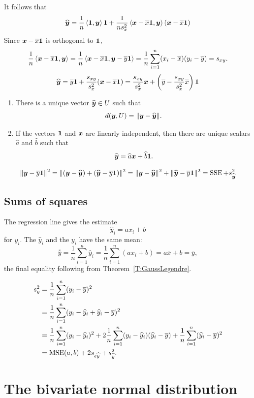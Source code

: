 \documentclass[12pt]{amsart}
\begin{document}
It follows that
\[
    \widehat{\boldsymbol{y}} = \frac1n\left\langle \mathbf{1}, \boldsymbol{y}\right\rangle\mathbf{1} + 
    \frac1{n s_x^2}\left\langle\boldsymbol{x} - \overline x\mathbf{1},\boldsymbol{y}\right\rangle (\boldsymbol{x} - \overline x\mathbf{1})
\]
Since $\boldsymbol{x}-\overline x\mathbf{1}$ is orthogonal to $\mathbf{1}$,
\[
    \frac1n\left\langle\boldsymbol{x} - \overline x\mathbf{1},\boldsymbol{y}\right\rangle = \frac1n\left\langle\boldsymbol{x} - \overline x\mathbf{1},\boldsymbol{y} - \overline y\mathbf{1}\right\rangle = \frac1n\sum_{i=1}^n(x_i-\overline x)(y_i-\overline y) = s_{xy}.
\]
\[
    \widehat {\boldsymbol{y}} = \overline y\mathbf{1} + \frac{s_{xy}}{s_x^2}(\boldsymbol{x}-\overline x\mathbf{1}) = \frac{s_{xy}}{s_x^2}\boldsymbol{x} + \left(\overline y - \frac{s_{xy}}{s_x^2}\overline x\right)\mathbf{1}
\]
\begin{theorem}\hfill
    \begin{enumerate}
        \item There is a unique vector $\widehat{\boldsymbol{y}}\in U$ such that 
    \[d(\boldsymbol{y}, U) = \|\boldsymbol{y}-\widehat{\boldsymbol{y}}\|.\]
    \item If the vectors $\mathbf{1}$ and $\boldsymbol{x}$ are linearly independent,
    then there are unique scalars $\hat a$ and $\hat b$ such that
    \[\widehat{\boldsymbol{y}} = \widehat a\boldsymbol{x} + \widehat b\mathbf{1}.\]
\end{enumerate}
\end{theorem}

\[
    \| \boldsymbol{y} - \overline y\mathbf{1}\|^2 = \| (\boldsymbol{y} - \widehat{\boldsymbol{y}})  + (\widehat{\boldsymbol{y}} - \overline y\mathbf{1})\|^2 = \|\boldsymbol{y} - \widehat {\boldsymbol{y}}\|^2 + \|\widehat {\boldsymbol{y}} - \overline y\mathbf{1}\|^2 = \operatorname{SSE} + s_{\widehat {\boldsymbol{y}}}^2
\]

\subsection{Sums of squares}
The regression line gives the estimate
\[
    \hat{y}_i = ax_i + b
\]
for $y_i$. The $\hat{y}_i$ and the $y_i$ have the same mean:
\[
    \overline{\hat y} = \frac1n\sum_{i=1}^n \hat{y}_i =\frac1n\sum_{i=1}^n(ax_i + b) =  a\bar{x} + b = \bar{y},
\]
the final equality following from Theorem~\ref{T:GaussLegendre}.

\begin{align*}
s_y^2 &= \frac1n\sum_{i=1}^n (y_i - \overline y)^2\\
&= \frac1n\sum_{i=1}^n (y_i - \widehat{y}_i + \widehat{y}_i - \overline y)^2\\
&= \frac1n\sum_{i=1}^n (y_i - \widehat{y}_i)^2 
+ 2\frac1n\sum_{i=1}^n (y_i - \widehat{y}_i)(\widehat{y}_i - \overline y)
+ \frac1n\sum_{i=1}^n(\widehat{y}_i - \overline y)^2\\
&= \operatorname{MSE}(a, b) + 2s_{e\widehat{y}} + s_{\widehat{y}}^2.
\end{align*}

\section{The bivariate normal distribution}
\end{document}

